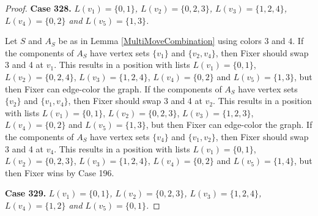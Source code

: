 \documentclass[12pt]{amsart}
\theoremstyle{plain}
\theoremstyle{definition}
\theoremstyle{remark}
\begin{document}
\begin{proof}
\noindent\textbf{Case 328.  }\textit{$L(v_1) = \{0, 1\}$, $L(v_2) = \{0, 2, 3\}$, $L(v_3) = \{1, 2, 4\}$, $L(v_4) = \{0, 2\}$ and $L(v_5) = \{1, 3\}$.}

Let $S$ and $A_S$ be as in Lemma \ref{MultiMoveCombination} using colors $3$ and $4$. If the components of $A_S$ have vertex sets $\{v_1\}$ and $\{v_2, v_4\}$, then Fixer should swap 3 and 4 at $v_1$. This results in a position with lists $L(v_1) = \{0, 1\}$, $L(v_2) = \{0, 2, 4\}$, $L(v_3) = \{1, 2, 4\}$, $L(v_4) = \{0, 2\}$ and $L(v_5) = \{1, 3\}$, but then Fixer can edge-color the graph. If the components of $A_S$ have vertex sets $\{v_2\}$ and $\{v_1, v_4\}$, then Fixer should swap 3 and 4 at $v_2$. This results in a position with lists $L(v_1) = \{0, 1\}$, $L(v_2) = \{0, 2, 3\}$, $L(v_3) = \{1, 2, 3\}$, $L(v_4) = \{0, 2\}$ and $L(v_5) = \{1, 3\}$, but then Fixer can edge-color the graph. If the components of $A_S$ have vertex sets $\{v_4\}$ and $\{v_1, v_2\}$, then Fixer should swap 3 and 4 at $v_4$. This results in a position with lists $L(v_1) = \{0, 1\}$, $L(v_2) = \{0, 2, 3\}$, $L(v_3) = \{1, 2, 4\}$, $L(v_4) = \{0, 2\}$ and $L(v_5) = \{1, 4\}$, but then Fixer wins by Case 196. 

\noindent\textbf{Case 329.  }\textit{$L(v_1) = \{0, 1\}$, $L(v_2) = \{0, 2, 3\}$, $L(v_3) = \{1, 2, 4\}$, $L(v_4) = \{1, 2\}$ and $L(v_5) = \{0, 1\}$.}


\end{proof}
\end{document}
